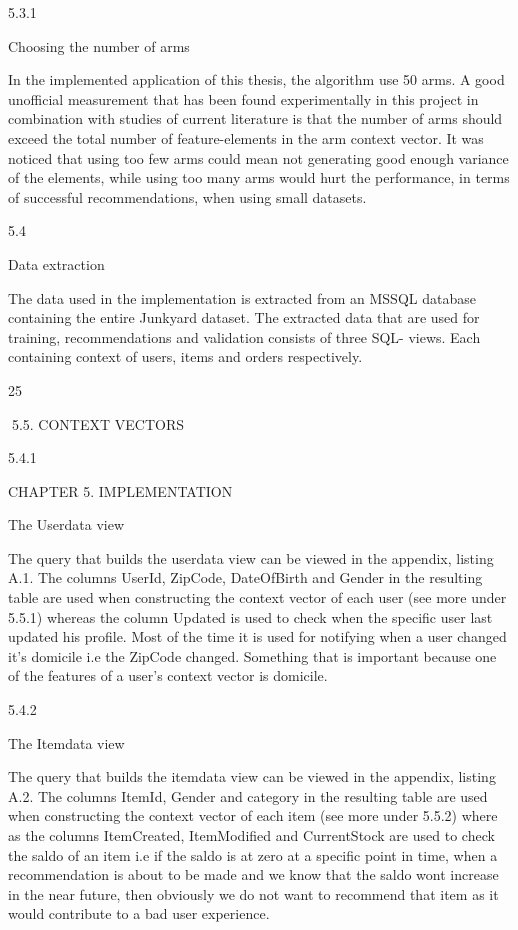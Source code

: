 5.3.1

Choosing the number of arms

In the implemented application of this thesis, the algorithm use 50 arms. A good unofficial measurement that has been found experimentally in this project in combination
with studies of current literature is that the number of arms should exceed the total
number of feature-elements in the arm context vector. It was noticed that using too few
arms could mean not generating good enough variance of the elements, while using too
many arms would hurt the performance, in terms of successful recommendations, when
using small datasets.

5.4

Data extraction

The data used in the implementation is extracted from an MSSQL database containing
the entire Junkyard dataset. The extracted data that are used for training, recommendations and validation consists of three SQL- views. Each containing context of users,
items and orders respectively.

25

5.5. CONTEXT VECTORS

5.4.1

CHAPTER 5. IMPLEMENTATION

The Userdata view

The query that builds the userdata view can be viewed in the appendix, listing A.1. The
columns UserId, ZipCode, DateOfBirth and Gender in the resulting table are used when
constructing the context vector of each user (see more under 5.5.1) whereas the column
Updated is used to check when the specific user last updated his profile. Most of the
time it is used for notifying when a user changed it’s domicile i.e the ZipCode changed.
Something that is important because one of the features of a user’s context vector is
domicile.

5.4.2

The Itemdata view

The query that builds the itemdata view can be viewed in the appendix, listing A.2. The
columns ItemId, Gender and category in the resulting table are used when constructing
the context vector of each item (see more under 5.5.2) where as the columns ItemCreated,
ItemModified and CurrentStock are used to check the saldo of an item i.e if the saldo is
at zero at a specific point in time, when a recommendation is about to be made and we
know that the saldo wont increase in the near future, then obviously we do not want to
recommend that item as it would contribute to a bad user experience.

